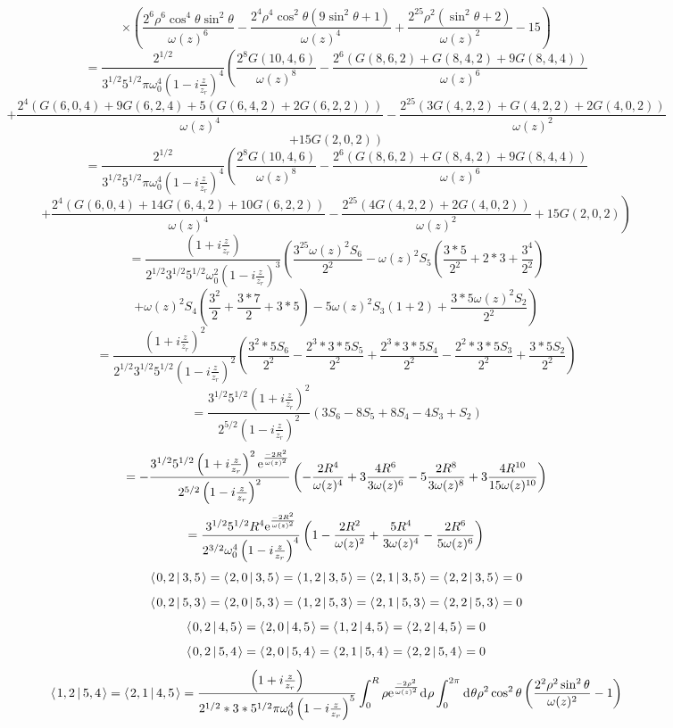 \documentclass[11pt]{amsart}
\makeatletter
\newcommand{\e}{{\rm e}}				%
\newcommand{\msp}[1]{\mspace{#1mu}}		%
\newcommand{\0}{\varnothing}		%
\newcommand{\dd}{\msp{1} {\rm{d}} \msp{1}}	%
\newcommand{\brac}[2]{\left\langle\msp{2} #1\left\lvert \msp{3.5} #2 \right.\right\rangle}	%
\newcommand{\1}{!}
\newcommand{\2}{@}
\newcommand{\3}{\#}
\newcommand{\4}{\$}
\newcommand{\5}{\%}
\newcommand{\6}{$^\wedge$}
\newcommand{\7}{\&}
\newcommand{\8}{*}
\newcommand{\9}{(}
\makeatother
\begin{document}
\[
\times\left(\frac{2^6\rho^6\cos^4\theta\sin^2\theta}{\omega(z)^6}-\frac{2^4\rho^4\cos^2\theta\left(9\sin^2\theta+1\right)}{\omega(z)^4}+\frac{2^25\rho^2\left(\sin^2\theta+2\right)}{\omega(z)^2}-15\right)
\]
\[
=\frac{2^{1/2}}{3^{1/2}5^{1/2}\pi\omega_0^4\left(1-i\frac{z}{z_r}\right)^4}\left(\frac{2^8G(10,4,6)}{\omega(z)^8}-\frac{2^6\left(G(8,6,2)+G(8,4,2)+9G(8,4,4)\right)}{\omega(z)^6}\right.
\]
\[
\left.+\frac{2^4\left(G(6,0,4)+9G(6,2,4)+5\left(G(6,4,2)+2G(6,2,2)\right)\right)}{\omega(z)^4}-\frac{2^25\left(3G(4,2,2)+G(4,2,2)+2G(4,0,2)\right)}{\omega(z)^2}\right.
\]
\[
\left.+15G(2,0,2)\right)
\]
\[
=\frac{2^{1/2}}{3^{1/2}5^{1/2}\pi\omega_0^4\left(1-i\frac{z}{z_r}\right)^4}\left(\frac{2^8G(10,4,6)}{\omega(z)^8}-\frac{2^6\left(G(8,6,2)+G(8,4,2)+9G(8,4,4)\right)}{\omega(z)^6}\right.
\]
\[
\left.+\frac{2^4\left(G(6,0,4)+14G(6,4,2)+10G(6,2,2)\right)}{\omega(z)^4}-\frac{2^25\left(4G(4,2,2)+2G(4,0,2)\right)}{\omega(z)^2}+15G(2,0,2)\right)
\]
\[
=\frac{\left(1+i\frac{z}{z_r}\right)}{2^{1/2}3^{1/2}5^{1/2}\omega_0^2\left(1-i\frac{z}{z_r}\right)^3}\left(\frac{3^25\omega(z)^2S_6}{2^2}-\omega(z)^2S_5\left(\frac{3*5}{2^2}+2*3+\frac{3^4}{2^2}\right)\right.
\]
\[
\left.+\omega(z)^2S_4\left(\frac{3^2}{2}+\frac{3*7}{2}+3*5\right)-5\omega(z)^2S_3\left(1+2\right)+\frac{3*5\omega(z)^2S_2}{2^2}\right)
\]
\[
=\frac{\left(1+i\frac{z}{z_r}\right)^2}{2^{1/2}3^{1/2}5^{1/2}\left(1-i\frac{z}{z_r}\right)^2}\left(\frac{3^2*5S_6}{2^2}-\frac{2^3*3*5S_5}{2^2}+\frac{2^3*3*5S_4}{2^2}-\frac{2^2*3*5S_3}{2^2}+\frac{3*5S_2}{2^2}\right)
\]
\[
=\frac{3^{1/2}5^{1/2}\left(1+i\frac{z}{z_r}\right)^2}{2^{5/2}\left(1-i\frac{z}{z_r}\right)^2}\left(3S_6-8S_5+8S_4-4S_3+S_2\right)
\]
\[
=-\frac{3^{1/2}5^{1/2}\left(1+i\frac{z}{z_r}\right)^2\e^{\frac{-2R^2}{\omega(z)^2}}}{2^{5/2}\left(1-i\frac{z}{z_r}\right)^2}\left(-\frac{2R^4}{\omega(z)^4}+3\frac{4R^6}{3\omega(z)^6}-5\frac{2R^8}{3\omega(z)^8}+3\frac{4R^{10}}{15\omega(z)^{10}}\right)
\]
\[
=\frac{3^{1/2}5^{1/2}R^4\e^{\frac{-2R^2}{\omega(z)^2}}}{2^{3/2}\omega_0^4\left(1-i\frac{z}{z_r}\right)^4}\left(1-\frac{2R^2}{\omega(z)^2}+\frac{5R^4}{3\omega(z)^4}-\frac{2R^6}{5\omega(z)^6}\right)
\]
\[
\brac{0,2}{3,5} = \brac{2,0}{3,5} = \brac{1,2}{3,5} = \brac{2,1}{3,5} = \brac{2,2}{3,5}=0
\]
\[
\brac{0,2}{5,3} = \brac{2,0}{5,3} = \brac{1,2}{5,3} = \brac{2,1}{5,3} = \brac{2,2}{5,3} = 0
\]
\[
\brac{0,2}{4,5} = \brac{2,0}{4,5} = \brac{1,2}{4,5} = \brac{2,2}{4,5} = 0
\]
\[
\brac{0,2}{5,4} = \brac{2,0}{5,4} = \brac{2,1}{5,4} = \brac{2,2}{5,4}=0
\]
\[
\brac{1,2}{5,4} = \brac{2,1}{4,5} = \frac{\left(1+i\frac{z}{z_r}\right)}{2^{1/2}*3*5^{1/2}\pi\omega_0^4\left(1-i\frac{z}{z_r}\right)^5}\int_0^R\rho \e^{\frac{-2\rho^2}{\omega(z)^2}}\dd \rho \int_0^{2\pi}\dd \theta \rho^2 \cos^2 \theta \left(\frac{2^2\rho^2\sin^2\theta}{\omega(z)^2}-1\right)
\]
\end{document}
